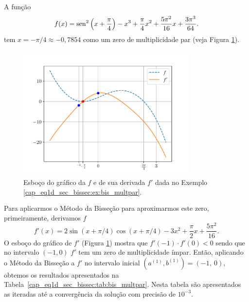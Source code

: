 \begin{ex}\label{cap_eq1d_sec_bissec:ex:bis_multpar}
  A função
\begin{equation}
  f(x) = \operatorname{sen}^2\left(x+\frac{\pi}{4}\right) - x^3 + \frac{\pi}{4}x^2 + \frac{5\pi^2}{16}x + \frac{3\pi^3}{64}.
\end{equation}
tem $x=-\pi/4\approx -0,7854$ como um zero de multiplicidade par (veja Figura \ref{cap_eq1d_sec_bissec:fig:bis_multpar}).

\begin{figure}[H]
  \centering
  \includegraphics[width=0.8\textwidth]{./cap_eq1d/dados/fig_bis_multpar/fig}
  \caption{Esboço do gráfico da $f$ e de sua derivada $f'$ dada no Exemplo \ref{cap_eq1d_sec_bissec:ex:bis_multpar}.}
  \label{cap_eq1d_sec_bissec:fig:bis_multpar}
\end{figure}

Para aplicarmos o Método da Bisseção para aproximarmos este zero, primeiramente, derivamos $f$
\begin{equation}
  f'(x) = 2\sin(x+\pi/4)\cos(x+\pi/4) - 3x^2 + \frac{\pi}{2}x + \frac{5\pi^2}{16}.
\end{equation}
O esboço do gráfico de $f'$ (Figura \ref{cap_eq1d_sec_bissec:fig:bis_multpar}) mostra que $f'(-1)\cdot f'(0) < 0$ sendo que no intervalo $(-1, 0)$ $f'$ tem um zero de multiplicidade ímpar. Então, aplicando o Método da Bisseção a $f'$ no intervalo inicial $(a^{(1)}, b^{(1)}) = (-1, ~0)$, obtemos os resultados apresentados na Tabela~\ref{cap_eq1d_sec_bissec:tab:bis_multpar}. Nesta tabela são apresentados as iteradas até a convergência da solução com precisão de $10^{-3}$.


\end{ex}
